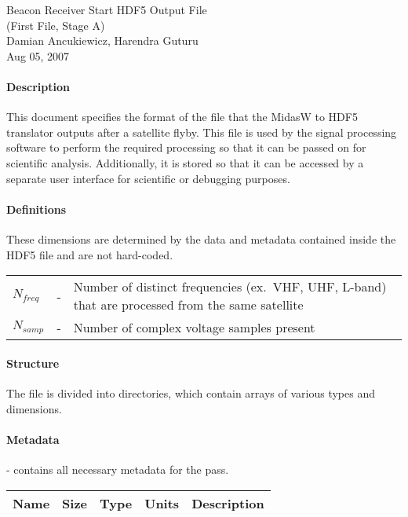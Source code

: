 \documentclass[12pt]{article}
\begin{document}
\begin{center}
\Large{Beacon Receiver Start HDF5 Output File}\\
\large{(First File, Stage A)}\\
\large{Damian Ancukiewicz, Harendra Guturu}\\
\large{Aug 05, 2007}
\end{center}

\begin{small}
\paragraph{Description}
This document specifies the format of the file that the MidasW to HDF5 translator outputs after a satellite flyby. This file is used by the signal processing software to perform the required processing so that it can be passed on for scientific analysis. Additionally, it is stored so that it can be accessed by a separate user interface for scientific or debugging purposes.
\paragraph{Definitions}
These dimensions are determined by the data and metadata contained inside the HDF5 file and are not hard-coded.\\

\begin{tabular}{l c p{10cm}}
$N_{freq}$ &-& Number of distinct frequencies (ex.~VHF, UHF, L-band) that are processed from the same satellite \\
$N_{samp}$ &-& Number of complex voltage samples present\\
\end{tabular}

\paragraph{Structure}
The file is divided into directories, which contain arrays of various types and dimensions. 

\paragraph{Metadata}- contains all necessary metadata for the pass.\\
\begin{scriptsize}
\begin{tabular}{|l|l|l|c|p{7cm}|}
\hline
\textbf{Name} & \textbf{Size} & \textbf{Type} & \textbf{Units} & \textbf{Description} \\
\hline


\end{tabular}
\end{scriptsize}
\end{small}
\end{document}
